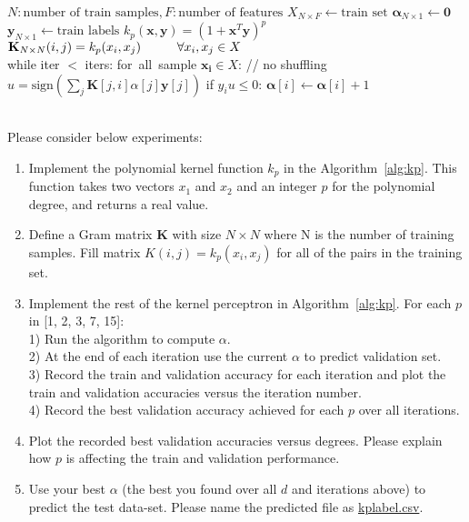 \documentclass{article}
\begin{document}
{\begin{algorithm}
\begin{algorithmic}[1]
\State $N: \mbox{number of train samples}, F: \mbox{number of features}$
\State $X_{N \times F} \gets \mbox{train set}$
\State $\bm{\alpha}_{N \times 1} \gets \bm{0}$
\State $\bm{y}_{N \times 1} \gets \mbox{train labels}$
\State $k_{p}(\bm{x}, \bm{y}) = (1 + 
\bm{x}^{T}\bm{y})^{p}$
\State $\textbf{K}_{N\times N}(i, j) = k_p(x_i, x_j) \hspace{10mm} \forall x_i, x_j \in X$ \\ 
\State while iter $<$ iters:
\State \hspace{10mm} \mbox{for all sample} $\bm{x_i} \in X$: // no shuffling
\State \hspace{20mm} $u=\mbox{sign}(\sum_j \textbf{K}[j,i]\alpha[j] \bm{y}[j])$
\State \hspace{20mm} if $y_i u\leq 0$:
\State \hspace{25mm} $\bm{\alpha}[i] \gets \bm{\alpha}[i] + 1$
\EndProcedure
\end{algorithmic}
\end{algorithm}\\
Please consider below experiments:\\
\begin{enumerate}
\item Implement the polynomial kernel function $k_p$ in the Algorithm~\ref{alg:kp}. This function takes two vectors $x_1$ and $x_2$ and an integer $p$ for the polynomial degree, and returns a real value. 
\item Define a Gram matrix $\textbf{K}$ with size $N \times N$ where N is the number of training samples. Fill matrix $K(i, j) = k_{p}(x_i, x_j)$ for all of the pairs in the training set.
\item Implement the rest of the kernel perceptron in Algorithm~\ref{alg:kp}. For each $p$ in [1, 2, 3, 7, 15]: \\
1) Run the algorithm to compute $\alpha$.\\
2) At the end of each iteration use the current $\alpha$ to predict validation set.\\
3) Record the train and validation accuracy for each iteration and plot the train and validation accuracies versus the iteration number.\\
4) Record the best validation accuracy achieved for each $p$ over all iterations.
\item Plot the recorded best validation accuracies versus degrees. Please explain how $p$ is affecting the train and validation performance. 
\item Use your best $\alpha$ (the best you found over all $d$ and iterations above) to predict the test data-set. Please name the predicted file as \underline{kplabel.csv}. 
\end{enumerate}

}
\end{document}
